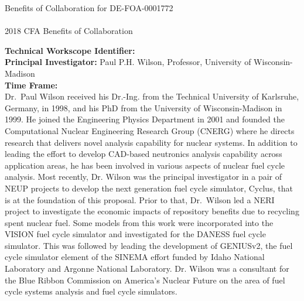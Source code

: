 \documentclass[dvips,12pt]{article}
\begin{document}
\begin{centering}
  Benefits of Collaboration for DE-FOA-0001772\\
  \textbf{\large \mytitle}\\
  2018 CFA Benefits of Collaboration \ID\\
\end{centering}
\vspace{1em}

\noindent\textbf{Technical Workscope Identifier:} \workscope\\
\textbf{Principal Investigator:} Paul P.H. Wilson, Professor, University of Wisconsin-Madison\\
\textbf{Time Frame:} \timeframe\\

Dr.\ Paul Wilson received his Dr.-Ing. from the Technical University of
Karlsruhe, Germany, in 1998, and his PhD from the University of
Wisconsin-Madison in 1999. He joined the Engineering Physics Department in
2001 and founded the Computational Nuclear Engineering Research Group (CNERG)
where he directs research that delivers novel analysis capability for nuclear
systems. In addition to leading the effort to develop CAD-based neutronics
analysis capability across application areas, he has been involved in various
aspects of nuclear fuel cycle analysis. Most recently, Dr. Wilson was the
principal investigator in a pair of NEUP projects to develop the next
generation fuel cycle simulator, Cyclus, that is at the foundation of this
proposal.  Prior to that, Dr.\ Wilson led a NERI project to investigate the
economic impacts of repository benefits due to recycling spent nuclear fuel.
Some models from this work were incorporated into the VISION fuel cycle
simulator and investigated for the DANESS fuel cycle simulator.  This was
followed by leading the development of GENIUSv2, the fuel cycle simulator
element of the SINEMA effort funded by Idaho National Laboratory and Argonne
National Laboratory.  Dr. Wilson was a consultant for the Blue Ribbon
Commission on America’s Nuclear Future on the area of fuel cycle systems
analysis and fuel cycle simulators.



\label{LastPage}
\end{document}
